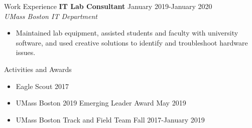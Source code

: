 \documentclass{resume} %
\begin{document}
\begin{rSection}{Work Experience}
\textbf{IT Lab Consultant} \hfill{January 2019-January 2020} \\
\textit{UMass Boston IT Department}
\begin{itemize}[leftmargin=*]
	\itemsep -0.5em \vspace{-0.5em}
	\item Maintained lab equipment, assisted students and faculty with university software, and used creative solutions to identify and troubleshoot hardware issues.
\end{itemize}


%

\end{rSection}

\begin{rSection}{Activities and Awards} \itemsep -3pt
\begin{itemize}[leftmargin=*]
	\itemsep -0.5em
	\item Eagle Scout \hfill {2017}
	\item UMass Boston 2019 Emerging Leader Award \hfill {May 2019}
	\item UMass Boston Track and Field Team \hfill {Fall 2017-January 2019} 
\end{itemize}
\end{rSection}
\end{document}
